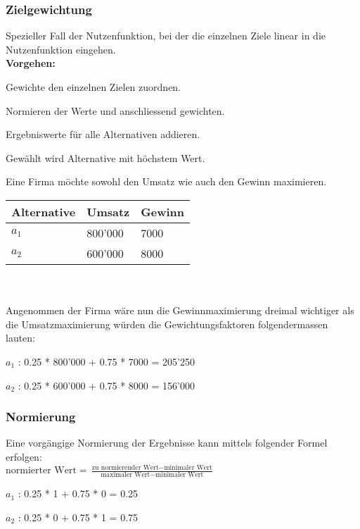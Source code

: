 \subsubsection{Zielgewichtung}
Spezieller Fall der Nutzenfunktion, bei der die einzelnen Ziele linear in die Nutzenfunktion eingehen.\\
\textbf{Vorgehen:} 
\begin{compactenum}
	\item Gewichte den einzelnen Zielen zuordnen.
	\item Normieren der Werte und anschliessend gewichten.
	\item Ergebniswerte für alle Alternativen addieren.
	\item Gewählt wird Alternative mit höchstem Wert.
\end{compactenum}
\begin{example}
	Eine Firma möchte sowohl den Umsatz	wie auch den Gewinn maximieren. \\
	\begin{tabular}{|l|l|l|}
		\hline
		\textbf{Alternative} & \textbf{Umsatz} & \textbf{Gewinn} \\ \hline
		$a_1$ & 800'000 & 7000 \\ \hline
		$a_2$ & 600'000 & 8000 \\ \hline		
	\end{tabular} \\ \ \\
	Angenommen der Firma wäre nun die Gewinnmaximierung dreimal wichtiger als die Umsatzmaximierung würden die Gewichtungsfaktoren folgendermassen lauten: 
	\begin{compactitem}
		\item $a_1$ : 0.25 * 800'000 + 0.75 * 7000 = 205'250
		\item $a_2$ : 0.25 * 600'000 + 0.75 * 8000 = 156'000
	\end{compactitem}
\end{example}

\subsubsection{Normierung}
Eine vorgängige Normierung der Ergebnisse kann mittels folgender Formel erfolgen: \\
$\text{normierter Wert} = \frac{\text{zu normierender Wert} - \text{minimaler Wert}}{\text{maximaler Wert} - \text{minimaler Wert}}$
\begin{example}
	\begin{compactitem}
		\item $a_1$ : 0.25 * 1 + 0.75 * 0 = 0.25
		\item $a_2$ : 0.25 * 0 + 0.75 * 1 = 0.75
	\end{compactitem}
\end{example}

